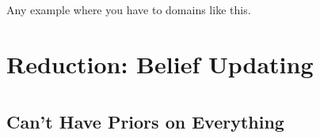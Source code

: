 \documentclass{article}
\begin{document}
	Any example where you have to domains like this.
	
	\section{Reduction: Belief Updating}
	
	
	\appendix
	\section{} %
	
	\subsection{Can't Have Priors on Everything}\label{sec:impossible-prior}
	
	
		
	
	
\end{document}
